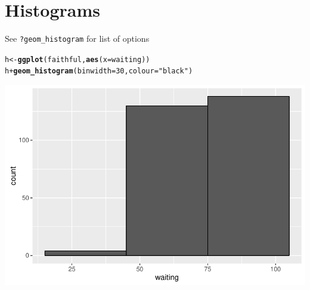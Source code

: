 \documentclass{beamer}\usepackage[]{graphicx}\usepackage[]{color}
\makeatletter
\newcommand{\hlnum}[1]{\textcolor[rgb]{0.686,0.059,0.569}{#1}}%
\newcommand{\hlstr}[1]{\textcolor[rgb]{0.192,0.494,0.8}{#1}}%
\newcommand{\hlopt}[1]{\textcolor[rgb]{0,0,0}{#1}}%
\newcommand{\hlstd}[1]{\textcolor[rgb]{0.345,0.345,0.345}{#1}}%
\newcommand{\hlkwb}[1]{\textcolor[rgb]{0.69,0.353,0.396}{#1}}%
\newcommand{\hlkwc}[1]{\textcolor[rgb]{0.333,0.667,0.333}{#1}}%
\newcommand{\hlkwd}[1]{\textcolor[rgb]{0.737,0.353,0.396}{\textbf{#1}}}%
\newenvironment{kframe}{%
 \def\at@end@of@kframe{}%
 \ifinner\ifhmode%
  \def\at@end@of@kframe{\end{minipage}}%
  \begin{minipage}{\columnwidth}%
 \fi\fi%
 \def\FrameCommand##1{\hskip\@totalleftmargin \hskip-\fboxsep
 \colorbox{shadecolor}{##1}\hskip-\fboxsep
     \hskip-\linewidth \hskip-\@totalleftmargin \hskip\columnwidth}%
 \MakeFramed {\advance\hsize-\width
   \@totalleftmargin\z@ \linewidth\hsize
   \@setminipage}}%
 {\par\unskip\endMakeFramed%
 \at@end@of@kframe}
\newenvironment{knitrout}{}{} %
\makeatother
\begin{document}

\section*{Histograms}
\frame{\sectionpage}


\begin{frame}[fragile]
See \texttt{?geom\_histogram} for list of options
\begin{knitrout}\footnotesize
{}\color{fgcolor}\begin{kframe}
\begin{alltt}
\hlstd{h} \hlkwb{<-} \hlkwd{ggplot}\hlstd{(faithful,} \hlkwd{aes}\hlstd{(}\hlkwc{x} \hlstd{= waiting))}
\hlstd{h} \hlopt{+} \hlkwd{geom_histogram}\hlstd{(}\hlkwc{binwidth} \hlstd{=} \hlnum{30}\hlstd{,} \hlkwc{colour} \hlstd{=} \hlstr{"black"}\hlstd{)}
\end{alltt}
\end{kframe}

{\centering \includegraphics[width=.75\linewidth]{figure/histogr-1} 

}



\end{knitrout}
\end{frame}

\end{document}
